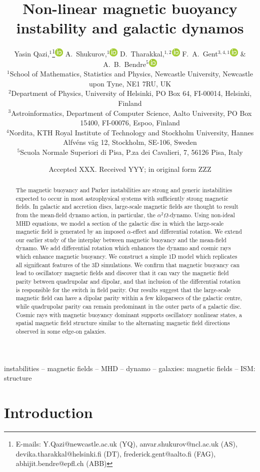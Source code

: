\documentclass[fleqn,usenatbib]{mnras}
\title[Non-linear magnetic buoyancy and galactic dynamos]{Non-linear magnetic buoyancy instability and galactic dynamos}
\author[Y.~Qazi et al.]{Yasin Qazi,$^{1}$\thanks{E-mails: Y.Qazi@newcastle.ac.uk (YQ), anvar.shukurov@ncl.ac.uk (AS), devika.tharakkal@helsinki.fi (DT), frederick.gent@aalto.fi (FAG), abhijit.bendre@epfl.ch (ABB)}\href{https://orcid.org/0009-0008-9513-8761}{\includegraphics[scale=0.5]{orcid_16x16.jpeg}}
A.~Shukurov,$^{1}$\href{https://orcid.org/0000-0001-6200-4304}{\includegraphics[scale=0.5]{orcid_16x16.jpeg}}
D.~Tharakkal,$^{1,2}$\href{https://orcid.org/0000-0002-4563-2277}{\includegraphics[scale=0.5]{orcid_16x16.jpeg}}
F.~A.~Gent$^{3,4,1}$\href{https://orcid.org/0000-0002-1331-2260}{\includegraphics[scale=0.5]{orcid_16x16.jpeg}}
\&
A.~B.~Bendre$^{5}$\href{https://orcid.org/0000-0001-5208-8989}{\includegraphics[scale=0.5]{orcid_16x16.jpeg}}
\\
$^{1}$School of Mathematics, Statistics and Physics, Newcastle University, Newcastle upon Tyne, NE1 7RU, UK\\
$^{2}$Department of Physics, University of Helsinki, PO Box 64, FI-00014, Helsinki, Finland\\
$^{3}$Astroinformatics, Department of Computer Science, Aalto University, PO Box 15400, FI-00076, Espoo, Finland\\
$^{4}$Nordita, KTH Royal Institute of Technology and Stockholm University, Hannes Alfv\'ens v\"ag 12, Stockholm, SE-106, Sweden\\
$^{5}$Scuola Normale Superiori di Pisa, P.za dei Cavalieri, 7, 56126 Pisa, Italy
}
\date{Accepted XXX. Received YYY; in original form ZZZ}
\begin{document}
\label{firstpage}
\pagerange{\pageref{firstpage}--\pageref{lastpage}}
\maketitle

\begin{abstract}
The magnetic buoyancy and Parker instabilities are strong and generic
instabilities expected to occur in most astrophysical systems with sufficiently
strong magnetic fields.  In galactic and accretion discs, large-scale magnetic
fields are thought to result from the mean-field dynamo action, in particular,
the $\alpha^2\Omega$-dynamo. Using non-ideal MHD equations, we model a section
of the galactic disc in which the large-scale magnetic field is generated by an
imposed $\alpha$-effect and differential rotation. We extend our earlier study
of the interplay between magnetic buoyancy and the mean-field dynamo. We add
differential rotation which enhances the dynamo and cosmic rays which enhance
magnetic buoyancy.  We construct a simple 1D model which replicates all
significant features of the 3D simulations.  We confirm that magnetic buoyancy
can lead to oscillatory magnetic fields and discover that it can {vary} the
magnetic field parity between quadrupolar and dipolar{,} and that inclusion
of the differential rotation is responsible for the switch in field parity.
Our results suggest that the large-scale magnetic field can have a dipolar
parity within a few kiloparsecs of the galactic centre, while quadrupolar
parity can remain predominant in the outer parts of a galactic disc.  Cosmic
rays with magnetic buoyancy dominant supports oscillatory nonlinear states, a
spatial magnetic field structure similar to the alternating magnetic field
directions observed in some edge-on galaxies.
\end{abstract}

\begin{keywords}
instabilities -- magnetic fields -- MHD -- dynamo -- galaxies: magnetic fields -- ISM: structure
\end{keywords}


\section{Introduction}
\end{document}
